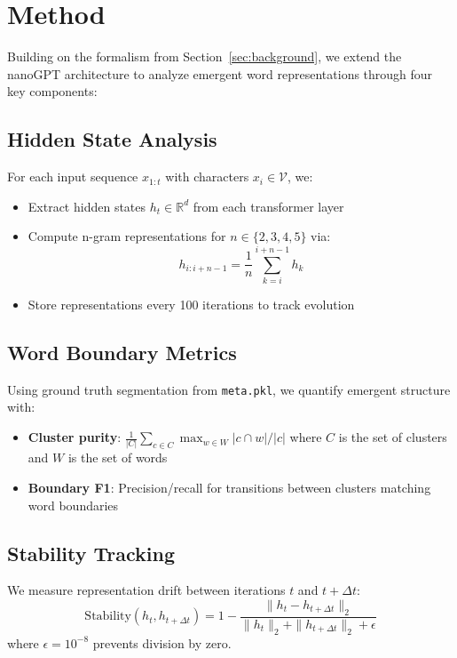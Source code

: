\documentclass{article} %
\begin{document}
\section{Method}
\label{sec:method}

Building on the formalism from Section~\ref{sec:background}, we extend the nanoGPT architecture \citep{karpathy2023nanogpt} to analyze emergent word representations through four key components:

\subsection{Hidden State Analysis}
For each input sequence $x_{1:t}$ with characters $x_i \in \mathcal{V}$, we:
\begin{itemize}
    \item Extract hidden states $h_t \in \mathbb{R}^d$ from each transformer layer
    \item Compute n-gram representations for $n \in \{2,3,4,5\}$ via:
    \begin{equation}
        h_{i:i+n-1} = \frac{1}{n}\sum_{k=i}^{i+n-1} h_k
    \end{equation}
    \item Store representations every 100 iterations to track evolution
\end{itemize}

\subsection{Word Boundary Metrics}
Using ground truth segmentation from \texttt{meta.pkl}, we quantify emergent structure with:
\begin{itemize}
    \item \textbf{Cluster purity}: $\frac{1}{|C|}\sum_{c\in C}\max_{w\in W}|c\cap w|/|c|$ where $C$ is the set of clusters and $W$ is the set of words
    \item \textbf{Boundary F1}: Precision/recall for transitions between clusters matching word boundaries
\end{itemize}

\subsection{Stability Tracking}
We measure representation drift between iterations $t$ and $t+\Delta t$:
\begin{equation}
    \text{Stability}(h_t,h_{t+\Delta t}) = 1 - \frac{\|h_t - h_{t+\Delta t}\|_2}{\|h_t\|_2 + \|h_{t+\Delta t}\|_2 + \epsilon}
\end{equation}
where $\epsilon=10^{-8}$ prevents division by zero.
\end{document}
